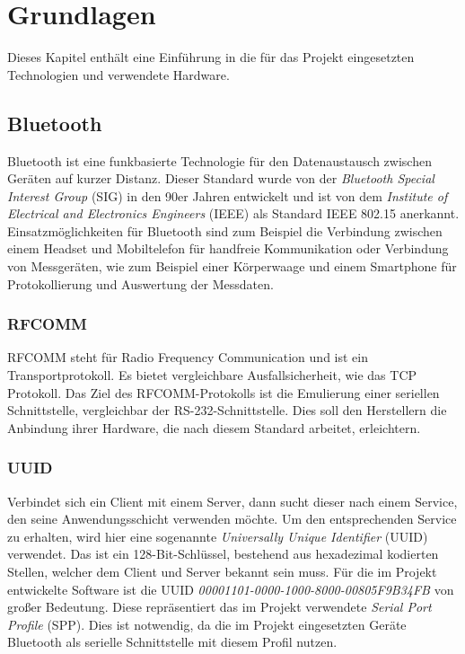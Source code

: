 
\chapter{Grundlagen}

Dieses Kapitel enth\"alt eine Einf\"uhrung in die f\"ur das Projekt eingesetzten Technologien und verwendete Hardware.

\section{Bluetooth}

Bluetooth ist eine funkbasierte Technologie f\"ur den Datenaustausch zwischen Ger\"aten auf kurzer Distanz.
Dieser Standard wurde von der \emph{Bluetooth Special Interest Group} (SIG)\cite{Bluetooth:01, Bluetooth:02} in den 90er Jahren entwickelt und
ist von dem \emph{Institute of Electrical and Electronics Engineers} (IEEE) als Standard IEEE 802.15\cite{Bluetooth:04} anerkannt.
Einsatzm\"oglichkeiten f\"ur Bluetooth sind zum Beispiel die Verbindung zwischen einem Headset und Mobiltelefon f\"ur handfreie Kommunikation 
oder Verbindung von Messger\"aten,
wie zum Beispiel einer K\"orperwaage und einem Smartphone f\"ur Protokollierung und Auswertung der Messdaten.\\


\subsection{RFCOMM}
RFCOMM steht f\"ur Radio Frequency Communication und ist ein Transportprotokoll. Es bietet vergleichbare Ausfallsicherheit, 
wie das TCP Protokoll. 
Das Ziel des RFCOMM-Protokolls ist die Emulierung einer seriellen Schnittstelle, vergleichbar der RS-232-Schnittstelle.
Dies soll den Herstellern die Anbindung ihrer Hardware, die nach diesem Standard arbeitet, erleichtern.
\cite[S. 10]{Bluetooth:03}\\

\subsection{UUID}

Verbindet sich ein Client mit einem Server, dann sucht dieser nach einem Service, den seine Anwendungsschicht verwenden m\"ochte. 
Um den entsprechenden Service zu erhalten, wird hier eine sogenannte \emph{Universally Unique Identifier} (UUID) verwendet.
Das ist ein 128-Bit-Schl\"ussel, bestehend aus hexadezimal kodierten Stellen, welcher dem Client und Server bekannt sein muss.
F\"ur die im Projekt entwickelte Software ist die UUID \emph{00001101-0000-1000-8000-00805F9B34FB} von gro\ss{}er Bedeutung.
Diese repr\"asentiert das im Projekt verwendete \emph{Serial Port Profile} (SPP). 
Dies ist notwendig, da die im Projekt eingesetzten Ger\"ate Bluetooth als serielle Schnittstelle mit diesem Profil nutzen.
\cite[S. 17]{Bluetooth:03}\\

